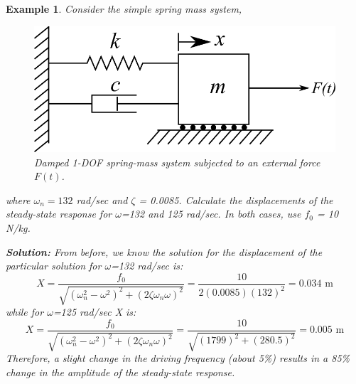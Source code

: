 \documentclass[12pt,letter]{article}
\newtheorem{ex}{Example}
\numberwithin{ex}{section} %
\newenvironment{example}{\begin{mdframed}[middlelinewidth=0.5mm]\begin{ex}\normalfont}{\end{ex}\end{mdframed}}
\numberwithin{re}{section} %
\numberwithin{vcs}{section} %
\begin{document}
\begin{example}

			Consider the simple spring mass system, 
			\begin{figure}[H]
				\centering
				\includegraphics[]{../figures/1-DOF-spring_dashpot_mass_horizontal_forced.png}
				\caption{Damped 1-DOF spring-mass system subjected to an external force $F(t)$.}
			\end{figure}				
			\noindent where $\omega_n = 132$ rad/sec and $\zeta$ = 0.0085. Calculate the displacements of the steady-state response for $\omega$=132 and 125 rad/sec. In both cases, use $f_0$ = 10 N/kg. 

			\noindent\textbf{Solution:}	From before, we know the solution for the displacement of the particular solution for $\omega$=132 rad/sec is:
			\begin{equation}
				X = \frac{f_0}{\sqrt{(\omega_n^2 - \omega^2)^2 +  (2\zeta \omega_n \omega)^2}} = \frac{10}{2(0.0085)(132)^2} = 0.034 \text{ m}
			\end{equation}							
			while for $\omega$=125 rad/sec X is:
			\begin{equation}
				X = \frac{f_0}{\sqrt{(\omega_n^2 - \omega^2)^2 +  (2\zeta \omega_n \omega)^2}} = \frac{10}{\sqrt{(1799)^2 +  (280.5)^2}}  = 0.005 \text{ m}
			\end{equation}				
			Therefore, a slight change in the driving frequency (about 5\%) results in a 85\% change in the amplitude of the steady-state response. 
\end{example}
\end{document}

